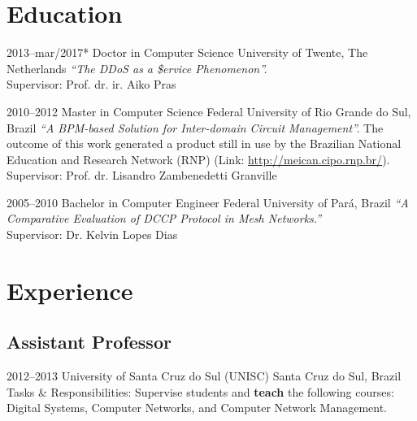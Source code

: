 \documentclass[print]{styles/friggeri-cv-linux} %
\begin{document}


\section{Education}

\begin{entrylist}

\entry
{2013--mar/2017*}
{Doctor {\normalfont in Computer Science}}
{University of Twente, The Netherlands}
{\emph{``The DDoS as a \$ervice Phenomenon''.} \\
Supervisor: Prof. dr. ir. Aiko Pras 
}	

\entry
{2010--2012}
{Master {\normalfont in Computer Science}}
{Federal University of Rio Grande do Sul, Brazil}
{\emph{``A BPM-based Solution for Inter-domain Circuit Management''.} The outcome of this work generated a product still in use by the Brazilian National Education and Research Network (RNP) (Link: \href{http://meican.cipo.rnp.br/}{http://meican.cipo.rnp.br/}).\\
Supervisor: Prof. dr. Lisandro Zambenedetti Granville}

\entry
{2005--2010}
{Bachelor {\normalfont in Computer Engineer}}
{Federal University of Par\'a, Brazil}
{\emph{``A Comparative Evaluation of DCCP Protocol in Mesh Networks.''} \\ 
Supervisor: Dr. Kelvin Lopes Dias
}

\end{entrylist}

\section{Experience}

\subsection{Assistant Professor}
\begin{entrylist}
\entry
{2012--2013}
{University of Santa Cruz do Sul (UNISC)}
{Santa Cruz do Sul, Brazil}
{Tasks \& Responsibilities: Supervise students and \textbf{teach} the following
courses: Digital Systems, Computer Networks, and Computer Network Management.}
\end{entrylist}
\end{document}

